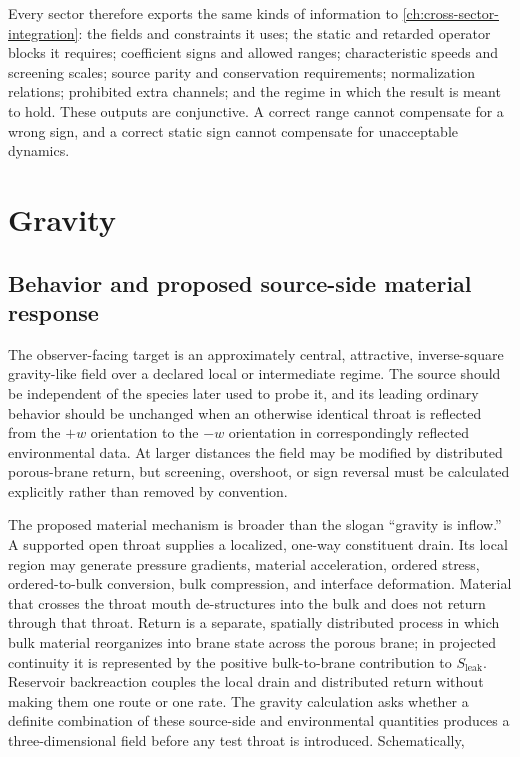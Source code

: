 Every sector therefore exports the same kinds of information to
\cref{ch:cross-sector-integration}: the fields and constraints it uses; the
static and retarded operator blocks it requires; coefficient signs and allowed
ranges; characteristic speeds and screening scales; source parity and
conservation requirements; normalization relations; prohibited extra channels;
and the regime in which the result is meant to hold. These outputs are
conjunctive. A correct range cannot compensate for a wrong sign, and a correct
static sign cannot compensate for unacceptable dynamics.

\section{Gravity}

\subsection{Behavior and proposed source-side material response}

The observer-facing target is an approximately central, attractive,
inverse-square gravity-like field over a declared local or intermediate regime.
The source should be independent of the species later used to probe it, and its
leading ordinary behavior should be unchanged when an otherwise identical
throat is reflected from the \(+w\) orientation to the \(-w\) orientation in
correspondingly reflected environmental data. At larger distances the field may
be modified by distributed porous-brane return, but screening, overshoot, or sign
reversal must be calculated explicitly rather than removed by convention.

The proposed material mechanism is broader than the slogan ``gravity is
inflow.'' A supported open throat supplies a localized, one-way constituent
drain. Its local region may generate pressure gradients, material acceleration,
ordered stress, ordered-to-bulk conversion, bulk compression, and interface
deformation. Material that crosses the throat mouth de-structures into the bulk
and does not return through that throat. Return is a separate, spatially
distributed process in which bulk material reorganizes into brane state across
the porous brane; in projected continuity it is represented by the positive
bulk-to-brane contribution to \(S_{\mathrm{leak}}\). Reservoir backreaction
couples the local drain and distributed return without making them one route or
one rate. The gravity calculation asks whether a definite combination of these
source-side and environmental quantities produces a three-dimensional field
before any test throat is introduced. Schematically,

